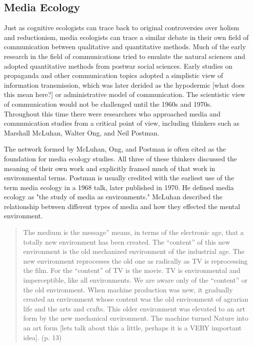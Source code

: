 \subsection{Media Ecology}

Just as cognitive ecologists can trace back to original controversies over holism and reductionism, media ecologists can trace a similar debate in their own field of communication between qualitative and quantitative methods. Much of the early research in the field of communications tried to emulate the natural sciences and adopted quantitative methods from postwar social sciences. Early studies on propaganda and other communication topics adopted a simplistic view of information transmission, which was later derided as the hypodermic [what does this mean here?] or administrative model of communication. The scientistic view of communication would not be challenged until the 1960s and 1970s. Throughout this time there were researchers who approached media and communication studies from a critical point of view, including thinkers such as Marshall McLuhan, Walter Ong, and Neil Postman.

The network formed by McLuhan, Ong, and Postman is often cited as the foundation for media ecology studies. All three of these thinkers discussed the meaning of their own work and explicitly framed much of that work in environmental terms. Postman is usually credited with the earliest use of the term media ecology in a 1968 talk, later published in 1970. He defined media ecology as "the study of media as environments." \citep{strate_media_2004} McLuhan described the relationship between different types of media and how they effected the mental environment.

\begin{quote}
The medium is the message” means, in terms of the electronic age, that a totally new environment has been created. The “content” of this new environment is the old mechanized environment of the industrial age. The new environment reprocesses the old one as radically as TV is reprocessing the film. For the “content” of TV is the movie. TV is environmental and imperceptible, like all environments. We are aware only of the “content” or the old environment. When machine production was new, it gradually created an environment whose content was the old environment of agrarian life and the arts and crafts. This older environment was elevated to an art form by the new mechanical environment. The machine turned Nature into an art form [lets talk about this a little, perhaps it is a VERY important idea].\citep{mcluhan_understanding_2013} (p. 13)
\end{quote}

